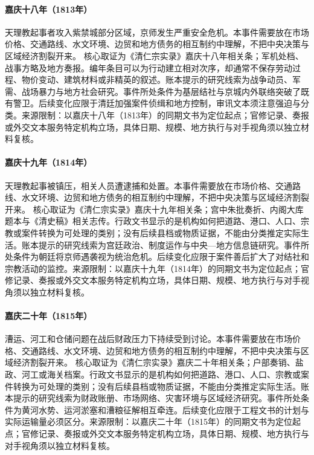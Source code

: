 \hypertarget{civic:EQ-1813-TIANLI-UPRISING}{}\paragraph{嘉庆十八年（1813年）}天理教起事者攻入紫禁城部分区域，京师发生严重安全危机。本事件需要放在市场价格、交通路线、水文环境、边贸和地方债务的相互制约中理解，不把中央决策与区域经济割裂开来。 核心取证为《清仁宗实录》嘉庆十八年相关条；军机处档、战事方略及地方奏报。编年条目可以为行动建立相对次序，却通常不保存劳动过程、物价变动、建筑材料或非精英的叙述。账本提示的研究线索为战争动员、军需、战场暴力与地方社会研究。事件所处条件为基层结社与京城内外联络突破了既有警卫。后续变化应限于清廷加强案件侦缉和地方控制，审讯文本须注意强迫与分类。来源限制：以嘉庆十八年（1813年）的同期文书为定位起点；官修记录、奏报或外交文本服务特定机构立场，具体日期、规模、地方执行与对手视角须以独立材料复核。
\hypertarget{civic:EQ-1814-TIANLI-SUPPRESSION}{}\paragraph{嘉庆十九年（1814年）}天理教起事被镇压，相关人员遭逮捕和处置。本事件需要放在市场价格、交通路线、水文环境、边贸和地方债务的相互制约中理解，不把中央决策与区域经济割裂开来。 核心取证为《清仁宗实录》嘉庆十九年相关条；宫中朱批奏折、内阁大库题本与《清史稿》相关志传。行政文书显示的是机构如何把道路、港口、人口、宗教或案件转换为可处理的类别；没有后续县档或物质证据，不能由分类推定实际生活。账本提示的研究线索为宫廷政治、制度运作与中央—地方信息链研究。事件所处条件为朝廷将京师遇袭视为统治危机。后续变化应限于案件善后扩大了对结社和宗教活动的监控。来源限制：以嘉庆十九年（1814年）的同期文书为定位起点；官修记录、奏报或外交文本服务特定机构立场，具体日期、规模、地方执行与对手视角须以独立材料复核。
\hypertarget{civic:EQ-1815-GRAND-CANAL-REPAIRS}{}\paragraph{嘉庆二十年（1815年）}漕运、河工和仓储问题在战后财政压力下持续受到讨论。本事件需要放在市场价格、交通路线、水文环境、边贸和地方债务的相互制约中理解，不把中央决策与区域经济割裂开来。 核心取证为《清仁宗实录》嘉庆二十年相关条；户部奏销、盐政、河工或海关档案。行政文书显示的是机构如何把道路、港口、人口、宗教或案件转换为可处理的类别；没有后续县档或物质证据，不能由分类推定实际生活。账本提示的研究线索为财政账册、市场网络、灾害环境与区域经济研究。事件所处条件为黄河水势、运河淤塞和漕粮征解相互牵连。后续变化应限于工程文书的计划与实际运输量必须区分。来源限制：以嘉庆二十年（1815年）的同期文书为定位起点；官修记录、奏报或外交文本服务特定机构立场，具体日期、规模、地方执行与对手视角须以独立材料复核。
